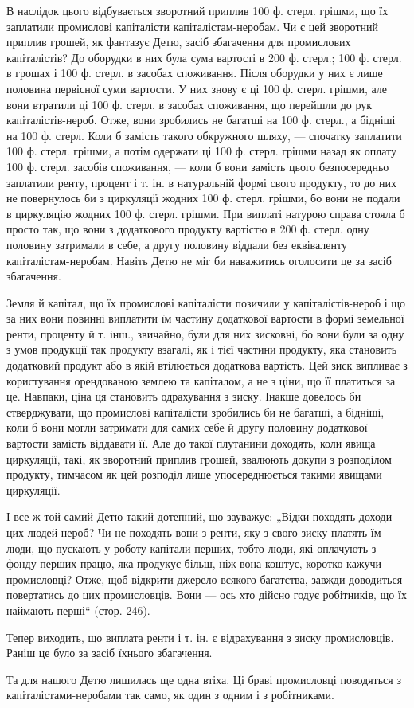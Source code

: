 В наслідок цього відбувається зворотний приплив 100 ф. стерл. грішми, що їх заплатили промислові
капіталісти капіталістам-неробам. Чи є цей зворотний приплив грошей, як фантазує Детю, засіб
збагачення для промислових капіталістів? До оборудки в них була сума вартості в 200 ф. стерл.; 100
ф. стерл. в грошах і 100 ф. стерл. в засобах споживання. Після оборудки у них є лише половина
первісної суми вартости. У них знову є ці 100 ф. стерл. грішми, але вони втратили ці 100 ф. стерл. в
засобах споживання, що перейшли до рук капіталістів-нероб. Отже, вони зробились не багатші на 100 ф.
стерл., а бідніші на 100 ф. стерл. Коли б замість такого обкружного шляху, — спочатку заплатити 100
ф. стерл. грішми, а потім одержати ці 100 ф. стерл. грішми назад як оплату 100 ф. стерл. засобів
споживання, — коли б вони замість цього безпосередньо заплатили ренту, процент і т. ін. в
натуральній формі свого продукту, то до них не повернулось би з циркуляції жодних 100 ф. стерл.
грішми, бо вони не подали в циркуляцію жодних 100 ф. стерл. грішми. При виплаті натурою справа
стояла б просто так, що вони з додаткового продукту вартістю в 200 ф. стерл. одну половину затримали
в себе, а другу половину віддали без еквіваленту капіталістам-неробам. Навіть Детю не міг би
наважитись оголосити це за засіб збагачення.

Земля й капітал, що їх промислові капіталісти позичили у капіталістів-нероб і що за них вони повинні
виплатити їм частину додаткової вартости в формі земельної ренти, проценту й т. інш., звичайно, були
для них зисковні, бо вони були за одну з умов продукції так продукту взагалі, як і тієї частини
продукту, яка становить додатковий продукт або в якій втілюється додаткова вартість. Цей зиск
випливає з користування орендованою землею та капіталом, а не з ціни, що її платиться за це.
Навпаки, ціна ця становить одрахування з зиску. Інакше довелось би стверджувати, що промислові
капіталісти зробились би не багатші, а бідніші, коли б вони могли затримати для самих себе й другу
половину додаткової вартости замість віддавати її. Але до такої плутанини доходять, коли явища
циркуляції, такі, як зворотний приплив грошей, звалюють докупи з розподілом продукту, тимчасом як
цей розподіл лише упосереднюється такими явищами циркуляції.

І все ж той самий Детю такий дотепний, що зауважує: „Відки походять доходи цих людей-нероб? Чи не
походять вони з ренти, яку з свого зиску платять їм люди, що пускають у роботу капітали перших,
тобто люди, які оплачують з фонду перших працю, яка продукує більш, ніж вона коштує, коротко кажучи
промисловці? Отже, щоб відкрити джерело всякого багатства, завжди доводиться повертатись до цих
промисловців. Вони — ось хто дійсно годує робітників, що їх наймають перші“ (стор. 246).

Тепер виходить, що виплата ренти і т. ін. є відрахування з зиску промисловців. Раніш це було за
засіб їхнього збагачення.

Та для нашого Детю лишилась ще одна втіха. Ці браві промисловці поводяться з капіталістами-неробами
так само, як один з одним і з робітниками.
\parbreak{}  %
